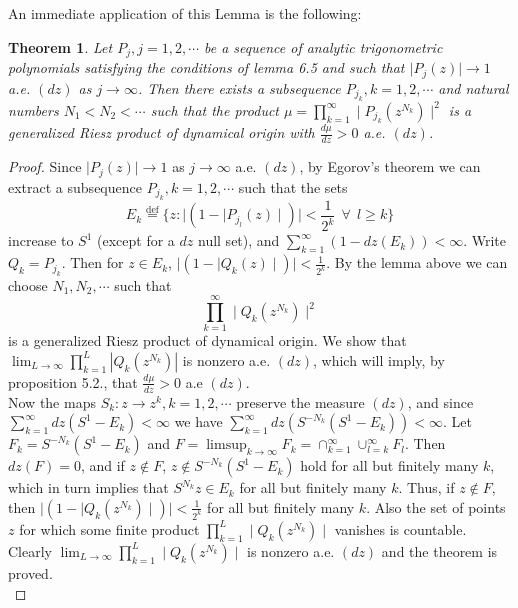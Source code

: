 \documentclass{amsart}
\newtheorem{Th}{Theorem}[section]
\theoremstyle{definition}
\theoremstyle{remark}
\numberwithin{equation}{section}
\newcommand{\egdef}{\stackrel{\textrm {def}}{=}}
\newcommand{\1}{\mathbb{1}}
\begin{document}
An immediate application of this Lemma is the following:\\
\begin{Th}\label{th7}
 {\it Let $P_j, j =1,2,\cdots$ be a sequence of analytic trigonometric polynomials satisfying the conditions of lemma 6.5 and  such that $\mid P_j(z)\mid \rightarrow 1 $ a.e. $(dz)$ as $j \rightarrow \infty$. Then there exists a subsequence $P_{j_k}, k=1,2,\cdots$ and natural numbers $N_1 < N_2 <  \cdots$ such that the product
$\mu =\prod_{k=1}^\infty \mid P_{j_k}(z^{N_k})\mid^2$  is a generalized Riesz product of dynamical origin with $\frac{d\mu}{dz} > 0$ a.e. $(dz)$. }
\end{Th}
\begin{proof}
 Since $\mid P_j(z)\mid \rightarrow 1$ as $j \rightarrow \infty$ a.e. $(dz)$, by Egorov's theorem we can extract a subsequence $P_{j_k}, k = 1,2,\cdots$ such that
the sets $$E_k \egdef \Big\{z: \mid (1- \mid P_{j_l}(z)\mid )\mid < \frac{1}{2^k} ~~\forall ~~l \geq k \Bigg\} $$
increase to $S^1$ (except for a $dz$ null set), and $\sum_{k=1}^\infty (1 -dz(E_k)) < \infty.$
 Write $Q_k = P_{j_k}$. Then for $z \in E_k$, $\mid (1 - \mid Q_k(z)\mid)\mid < \frac{1}{2^k}$.  By the lemma above we can choose $N_1, N_2, \cdots$ such that
$$\prod_{k=1}^\infty \mid Q_k(z^{N_k}) \mid^2$$ is a generalized Riesz product of dynamical origin. We show that $\displaystyle \lim_{L\rightarrow \infty}\prod_{k=1}^L|Q_k(z^{N_k})|$
is nonzero a.e. $(dz)$, which will imply, by proposition 5.2., that $\frac{d\mu}{dz} > 0$ a.e $(dz)$.\\

 Now the maps $S_k: z \rightarrow z^k, k=1,2,\cdots$ preserve the measure $(dz)$, and since $\sum_{k=1}^\infty dz(S^1 -E_k) < \infty$ we have
 $\sum_{k=1}^\infty dz(S^{-N_k}(S^1 - E_k)) < \infty$. Let $F_k = S^{-N_k}(S^1 - E_k)$ and
 $F = \limsup_{k\rightarrow \infty} F_k = \cap_{k=1}^\infty\cup_{l=k}^\infty F_l$.
 Then $dz(F) =0$, and if $z\notin F$, $z \notin S^{-N_k}(S^1 - E_k)$ hold for all but
 finitely many $k$, which in turn implies that $S^{N_k}z \in E_k$ for all but finitely many $k$.
 Thus, if $z \notin F$, then $\mid (1 - \mid Q_k(z^{N_k})\mid)\mid < \frac{1}{2^k}$ for all but finitely many $k$. Also the set of points $z$ for which some finite product $\prod_{k=1}^L\mid Q_k(z^{N_k})\mid$ vanishes is countable. Clearly
$\lim_{L\rightarrow \infty}\prod_{k=1}^L\mid Q_k(z^{N_k})\mid$
is nonzero a.e. $(dz)$ and the theorem is proved.\\
\end{proof}
\end{document}
